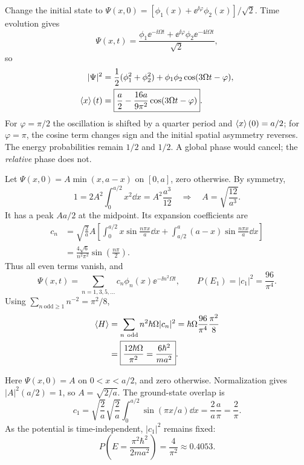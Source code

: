 Change the initial state to
$\Psi(x,0)=[\phi_1(x)+\ee^{\ii\varphi}\phi_2(x)]/\sqrt2$.
Time evolution gives
\begin{equation}
\Psi(x,t)=\frac{\phi_1\ee^{-\ii\Omega t}
+\ee^{\ii\varphi}\phi_2\ee^{-4\ii\Omega t}}{\sqrt2},
\end{equation}
so
\begin{align}
|\Psi|^2&=\frac12(\phi_1^2+\phi_2^2)
+\phi_1\phi_2\cos(3\Omega t-\varphi),\\
\left\langle x\right\rangle(t)&=\boxed{\frac a2-\frac{16a}{9\pi^2}
\cos(3\Omega t-\varphi)}.
\end{align}
For $\varphi=\pi/2$ the oscillation is shifted by a quarter
period and $\left\langle x\right\rangle(0)=a/2$; for $\varphi=\pi$, the cosine term changes
sign and the initial spatial asymmetry reverses. The energy
probabilities remain $1/2$ and $1/2$. A global phase would cancel;
the \emph{relative} phase does not.

Let $\Psi(x,0)=A\min(x,a-x)$ on $[0,a]$, zero otherwise.
By symmetry,
\begin{equation}
1=2A^2\int_0^{a/2}x^2\dd x
=A^2\frac{a^3}{12}
\quad\Longrightarrow\quad A=\sqrt{\frac{12}{a^3}}.
\end{equation}
It has a peak $Aa/2$ at the midpoint. Its expansion coefficients are
\begin{align}
c_n&=\sqrt{\frac2a}A\left[
\int_0^{a/2}x\sin\frac{n\pi x}{a}\dd x+
\int_{a/2}^{a}(a-x)\sin\frac{n\pi x}{a}\dd x\right]\\
&=\boxed{\frac{4\sqrt6}{n^2\pi^2}
\sin\left(\frac{n\pi}{2}\right)}.
\end{align}
Thus all even terms vanish, and
\begin{equation}
\Psi(x,t)=\sum_{n=1,3,5,\ldots}c_n\phi_n(x)
\ee^{-\ii n^2\Omega t},\qquad
P(E_1)=|c_1|^2=\frac{96}{\pi^4}.
\end{equation}
Using $\sum_{n\ \mathrm{odd}\ge1}n^{-2}=\pi^2/8$,
\begin{align}
\left\langle H\right\rangle&=\sum_{n\ \mathrm{odd}}n^2\hbar\Omega|c_n|^2
=\hbar\Omega\frac{96}{\pi^4}\frac{\pi^2}{8}\\
&=\boxed{\frac{12\hbar\Omega}{\pi^2}
=\frac{6\hbar^2}{ma^2}}.
\end{align}

Here $\Psi(x,0)=A$ on $0<x<a/2$, and zero otherwise.
Normalization gives $|A|^2(a/2)=1$, so $A=\sqrt{2/a}$.
The ground-state overlap is
\begin{equation}
c_1=\sqrt{\frac2a}\sqrt{\frac2a}
\int_0^{a/2}\sin(\pi x/a)\dd x
=\frac{2}{a}\frac{a}{\pi}
=\frac2\pi.
\end{equation}
As the potential is time-independent, $|c_1|^2$ remains fixed:
\begin{equation}
\boxed{P\left(E=\frac{\pi^2\hbar^2}{2ma^2}\right)
=\frac4{\pi^2}\approx0.4053.}
\end{equation}

